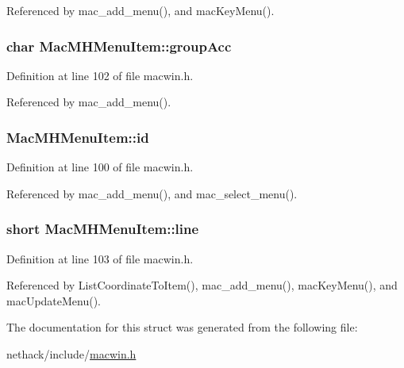Referenced by mac\+\_\+add\+\_\+menu(), and mac\+Key\+Menu().

\hypertarget{structMacMHMenuItem_afeae904d657b8f6a9850231dd438991f}{
\subsubsection[{group\+Acc}]{\setlength{\rightskip}{0pt plus 5cm}char Mac\+M\+H\+Menu\+Item\+::group\+Acc}}\label{structMacMHMenuItem_afeae904d657b8f6a9850231dd438991f}


Definition at line 102 of file macwin.\+h.



Referenced by mac\+\_\+add\+\_\+menu().

\hypertarget{structMacMHMenuItem_ab6b99da9d3632f83a43912e5dc25ddf6}{
\subsubsection[{id}]{ Mac\+M\+H\+Menu\+Item\+::id}}\label{structMacMHMenuItem_ab6b99da9d3632f83a43912e5dc25ddf6}


Definition at line 100 of file macwin.\+h.



Referenced by mac\+\_\+add\+\_\+menu(), and mac\+\_\+select\+\_\+menu().

\hypertarget{structMacMHMenuItem_a0e9a0b7017f49c63040969a1912fcaf6}{
\subsubsection[{line}]{\setlength{\rightskip}{0pt plus 5cm}short Mac\+M\+H\+Menu\+Item\+::line}}\label{structMacMHMenuItem_a0e9a0b7017f49c63040969a1912fcaf6}


Definition at line 103 of file macwin.\+h.



Referenced by List\+Coordinate\+To\+Item(), mac\+\_\+add\+\_\+menu(), mac\+Key\+Menu(), and mac\+Update\+Menu().



The documentation for this struct was generated from the following file\+:\begin{DoxyCompactItemize}
\item 
nethack/include/\hyperlink{macwin_8h}{macwin.\+h}\end{DoxyCompactItemize}
